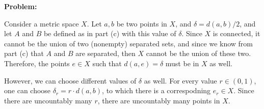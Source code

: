 \documentclass[10pt]{article}
\newenvironment{problem}{\textbf{Problem:}}{}
\begin{document}
\begin{problem}
\begin{enumerate}[label=\alph*)]
				\begin{solution}
					Consider a metric space \( X \). Let \( a, b \) be two points in \( X \), and \( \delta = 
					d(a, b) / 2\), and let \( A \) and \( B \) be defined as in part (c) with this value 
					of \( \delta \). Since \( X \) is connected, it cannot be the union of two (nonempty) 
					separated sets, and since we know from part (c) that \( A \) and \( B \) are separated, 
					then \( X \) cannot be the union of these two. Therefore, the points 
					\( e \in X \) such that \( d(a, e) = \delta \) must be in \( X \) as well.

					However, we can choose different values of \( \delta \) as well. For every 
					value \( r \in (0, 1) \), one can choose \( \delta_r = r \cdot d(a, b) \), 
					to which there is a correspodning \( e_r \in X \). Since there are uncountably many 
					\( r \), there are uncountably many points in \( X \). 
				\end{solution}
		\end{enumerate}
	\end{problem}
\end{document}
